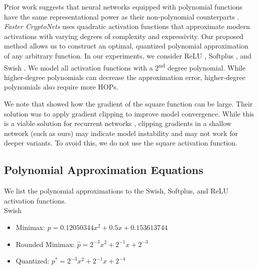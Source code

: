 \documentclass[conference]{IEEEtran}
\begin{document}
Prior work suggests that neural networks equipped with polynomial functions have the same representational power as their non-polynomial counterparts \cite{gautier2016globally,livni2014computational}.
\textit{Faster CryptoNets} uses quadratic activation functions that approximate modern activations with varying degrees of complexity and expressivity. 
Our proposed method allows us to construct an optimal, quantized polynomial approximation of any arbitrary function.
In our experiments, we consider ReLU \cite{glorot2011deep}, Softplus \cite{dugas2001incorporating}, and Swish \cite{ramachandran2017swish}.
We model all activation functions with a 2\textsuperscript{nd} degree polynomial.
While higher-degree polynomials can decrease the approximation error, higher-degree polynomials also require more HOPs.


We note that \cite{ghodsi2017safetynets} showed how the gradient of the square function can be large.
Their solution was to apply gradient clipping to improve model convergence.
While this is a viable solution for recurrent networks \cite{chung2014empirical}, clipping gradients in a shallow network (such as ours) may indicate model instability and may not work for deeper variants.
To avoid this, we do not use the square activation function.

\subsection{Polynomial Approximation Equations}
We list the polynomial approximations to the Swish, Softplus, and ReLU activation functions.\\

Swish 
\begin{itemize}
    \item Minimax: $p = 0.12050344x^2 +  0.5x + 0.153613744$
    \item Rounded Minimax: $\hat{p} = 2^{-3}x^2 + 2^{-1}x + 2^{-3}$
    \item Quantized: $p^* = 2^{-3}x^2 + 2^{-1}x + 2^{-4}$
\end{itemize}
\end{document}
